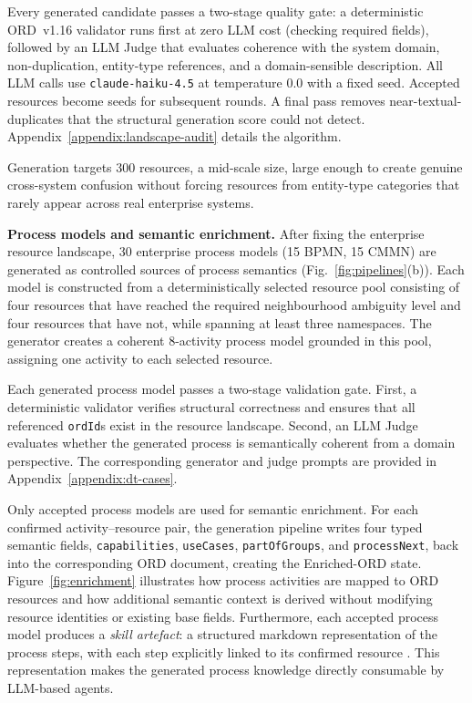\documentclass[10pt,twocolumn]{article}
\begin{document}
Every generated candidate passes a two-stage quality gate: a deterministic ORD~v1.16 validator runs first at zero LLM cost (checking required fields), followed by an LLM Judge that evaluates coherence with the system domain, non-duplication, entity-type references, and a domain-sensible description. All LLM calls use \texttt{claude-haiku-4.5} at temperature 0.0 with a fixed seed. Accepted resources become seeds for subsequent rounds. A final pass removes near-textual-duplicates that the structural generation score could not detect. Appendix~\ref{appendix:landscape-audit} details the algorithm.

Generation targets 300 resources, a mid-scale size, large enough to create genuine cross-system confusion without forcing resources from entity-type categories that rarely appear across real enterprise systems.



\textbf{Process models and semantic enrichment.} After fixing the enterprise resource landscape, 30 enterprise process models (15 BPMN, 15 CMMN) are generated as controlled sources of process semantics (Fig.~\ref{fig:pipelines}(b)). Each model is constructed from a deterministically selected resource pool consisting of four resources that have reached the required neighbourhood ambiguity level and four resources that have not, while spanning at least three namespaces. The generator creates a coherent 8-activity process model grounded in this pool, assigning one activity to each selected resource.

Each generated process model passes a two-stage validation gate. First, a deterministic validator verifies structural correctness and ensures that all referenced \texttt{ordId}s exist in the resource landscape. Second, an LLM Judge evaluates whether the generated process is semantically coherent from a domain perspective. The corresponding generator and judge prompts are provided in Appendix~\ref{appendix:dt-cases}.

Only accepted process models are used for semantic enrichment. For each confirmed activity--resource pair, the generation pipeline writes four typed semantic fields, \texttt{capabilities}, \texttt{useCases}, \texttt{partOfGroups}, and \texttt{processNext}, back into the corresponding ORD document, creating the Enriched-ORD state. Figure~\ref{fig:enrichment} illustrates how process activities are mapped to ORD resources and how additional semantic context is derived without modifying resource identities or existing base fields. Furthermore, each accepted process model produces a \emph{skill artefact}: a structured markdown representation of the process steps, with each step explicitly linked to its confirmed resource \citep{anthropic_skills_2025}. This representation makes the generated process knowledge directly consumable by LLM-based agents.
\end{document}
